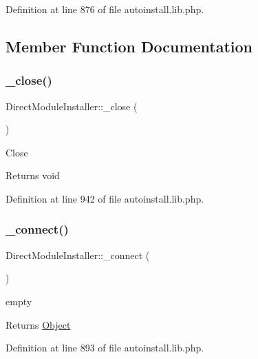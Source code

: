 Definition at line 876 of file autoinstall.\+lib.\+php.



\subsection{Member Function Documentation}
\hypertarget{classDirectModuleInstaller_acda2b7c05a32c6f9641fc24c2e3e6962}{}\label{classDirectModuleInstaller_acda2b7c05a32c6f9641fc24c2e3e6962} 
\subsubsection{\texorpdfstring{\+\_\+close()}{\_close()}}
{\footnotesize\ttfamily Direct\+Module\+Installer\+::\+\_\+close (\begin{DoxyParamCaption}{ }\end{DoxyParamCaption})}

Close

\begin{DoxyReturn}{Returns}
void 
\end{DoxyReturn}


Definition at line 942 of file autoinstall.\+lib.\+php.

\hypertarget{classDirectModuleInstaller_a8131092380fdf3c78082de11f4c83f70}{}\label{classDirectModuleInstaller_a8131092380fdf3c78082de11f4c83f70} 
\subsubsection{\texorpdfstring{\+\_\+connect()}{\_connect()}}
{\footnotesize\ttfamily Direct\+Module\+Installer\+::\+\_\+connect (\begin{DoxyParamCaption}{ }\end{DoxyParamCaption})}

empty

\begin{DoxyReturn}{Returns}
\hyperlink{classObject}{Object} 
\end{DoxyReturn}


Definition at line 893 of file autoinstall.\+lib.\+php.

\hypertarget{classDirectModuleInstaller_acc70fcfb029792d83a577fbbebfcb918}{}\label{classDirectModuleInstaller_acc70fcfb029792d83a577fbbebfcb918} 
